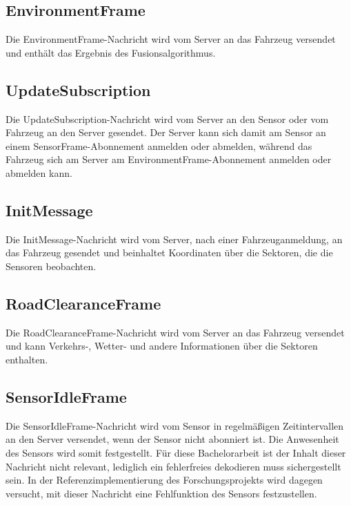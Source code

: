 \subsection{EnvironmentFrame}
\label{msg:environment_frame}

Die EnvironmentFrame-Nachricht wird vom Server an das Fahrzeug versendet und enthält das Ergebnis des Fusionsalgorithmus.

\subsection{UpdateSubscription}
\label{msg:update_subscription}

Die UpdateSubscription-Nachricht wird vom Server an den Sensor oder vom Fahrzeug an den Server gesendet.
Der Server kann sich damit am Sensor an einem SensorFrame-Abonnement anmelden oder abmelden, während das Fahrzeug sich am Server am EnvironmentFrame-Abonnement anmelden oder abmelden kann.

\subsection{InitMessage}
\label{msg:init_message}

Die InitMessage-Nachricht wird vom Server, nach einer Fahrzeuganmeldung, an das Fahrzeug gesendet und beinhaltet Koordinaten über die Sektoren, die die Sensoren beobachten.

\subsection{RoadClearanceFrame}

Die RoadClearanceFrame-Nachricht wird vom Server an das Fahrzeug versendet und kann Verkehrs-, Wetter- und andere Informationen über die Sektoren enthalten.

\subsection{SensorIdleFrame}
\label{msg:sensor_idle_frame}

Die SensorIdleFrame-Nachricht wird vom Sensor in regelmäßigen Zeitintervallen an den Server versendet, wenn der Sensor nicht abonniert ist.
Die Anwesenheit des Sensors wird somit festgestellt.
Für diese Bachelorarbeit ist der Inhalt dieser Nachricht nicht relevant, lediglich ein fehlerfreies dekodieren muss sichergestellt sein.
In der Referenzimplementierung des Forschungsprojekts wird dagegen versucht, mit dieser Nachricht eine Fehlfunktion des Sensors festzustellen.



